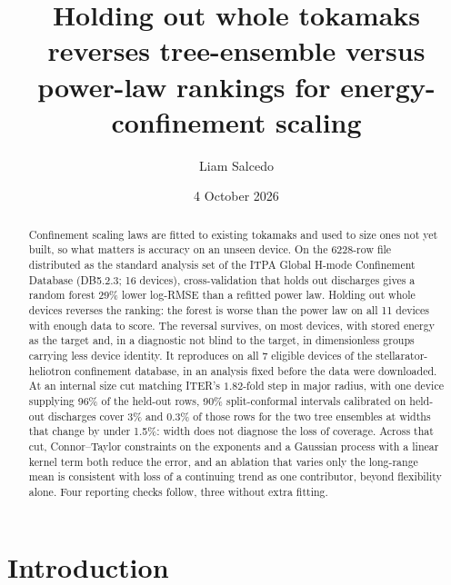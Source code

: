 \documentclass[aip,pop,preprint,amsmath,amssymb]{revtex4-2}
\begin{document}
\title{Holding out whole tokamaks reverses tree-ensemble versus power-law
rankings for energy-confinement scaling}
\author{Liam Salcedo}
\date{4 October 2026}

\begin{abstract}
Confinement scaling laws are fitted to existing tokamaks and used to size ones
not yet built, so what matters is accuracy on an unseen device. On the
6228-row file distributed as the standard analysis set of the ITPA Global
H-mode Confinement Database (DB5.2.3; 16 devices), cross-validation that holds
out discharges gives a random forest 29\% lower log-RMSE than a refitted power
law. Holding out whole devices reverses the
ranking: the forest is worse than the power law on all 11 devices with enough
data to score. The reversal survives, on most devices, with stored energy as the target and,
in a diagnostic not blind to the target, in dimensionless groups carrying less
device identity.
It reproduces on all 7 eligible devices of the stellarator-heliotron
confinement database, in an analysis fixed before the data were downloaded.
At an internal size cut matching ITER's $1.82$-fold step in major radius,
with one device supplying 96\% of the held-out rows, 90\% split-conformal
intervals calibrated on held-out discharges cover 3\% and 0.3\% of those rows
for the two tree ensembles at widths that change by under 1.5\%: width does
not diagnose the loss of coverage. Across that cut, Connor--Taylor
constraints on the exponents and a Gaussian process with a linear kernel term
both reduce the error, and an ablation that varies only the long-range mean
is consistent with loss of a continuing trend as one contributor, beyond
flexibility alone. Four reporting checks follow, three without extra fitting.
\end{abstract}


\maketitle

\section{Introduction}
\label{sec:intro}
\end{document}
